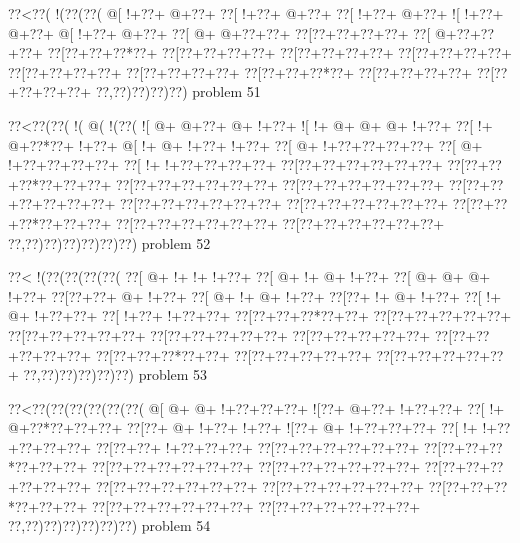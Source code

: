 \vbox{\vbox{\goo
\0??<\0??(\- !(\0??(\0??(
\- @[\- !+\0??+\- @+\0??+
\0??[\- !+\0??+\- @+\0??+
\0??[\- !+\0??+\- @+\0??+
\- ![\- !+\0??+\- @+\0??+
\- @[\- !+\0??+\- @+\0??+
\0??[\- @+\- @+\0??+\0??+
\0??[\0??+\0??+\0??+\0??+
\0??[\- @+\0??+\0??+\0??+
\0??[\0??+\0??+\0??*\0??+
\0??[\0??+\0??+\0??+\0??+
\0??[\0??+\0??+\0??+\0??+
\0??[\0??+\0??+\0??+\0??+
\0??[\0??+\0??+\0??+\0??+
\0??[\0??+\0??+\0??+\0??+
\0??[\0??+\0??+\0??*\0??+
\0??[\0??+\0??+\0??+\0??+
\0??[\0??+\0??+\0??+\0??+
\0??,\0??)\0??)\0??)\0??)
}
\hfil problem 51\hfil\break
}

\vbox{\vbox{\goo
\0??<\0??(\0??(\- !(\- @(\- !(\0??(
\- ![\- @+\- @+\0??+\- @+\- !+\0??+
\- ![\- !+\- @+\- @+\- @+\- !+\0??+
\0??[\- !+\- @+\0??*\0??+\- !+\0??+
\- @[\- !+\- @+\- !+\0??+\- !+\0??+
\0??[\- @+\- !+\0??+\0??+\0??+\0??+
\0??[\- @+\- !+\0??+\0??+\0??+\0??+
\0??[\- !+\- !+\0??+\0??+\0??+\0??+
\0??[\0??+\0??+\0??+\0??+\0??+\0??+
\0??[\0??+\0??+\0??*\0??+\0??+\0??+
\0??[\0??+\0??+\0??+\0??+\0??+\0??+
\0??[\0??+\0??+\0??+\0??+\0??+\0??+
\0??[\0??+\0??+\0??+\0??+\0??+\0??+
\0??[\0??+\0??+\0??+\0??+\0??+\0??+
\0??[\0??+\0??+\0??+\0??+\0??+\0??+
\0??[\0??+\0??+\0??*\0??+\0??+\0??+
\0??[\0??+\0??+\0??+\0??+\0??+\0??+
\0??[\0??+\0??+\0??+\0??+\0??+\0??+
\0??,\0??)\0??)\0??)\0??)\0??)\0??)
}
\hfil problem 52\hfil\break
}

\vbox{\vbox{\goo
\0??<\- !(\0??(\0??(\0??(\0??(
\0??[\- @+\- !+\- !+\- !+\0??+
\0??[\- @+\- !+\- @+\- !+\0??+
\0??[\- @+\- @+\- @+\- !+\0??+
\0??[\0??+\0??+\- @+\- !+\0??+
\0??[\- @+\- !+\- @+\- !+\0??+
\0??[\0??+\- !+\- @+\- !+\0??+
\0??[\- !+\- @+\- !+\0??+\0??+
\0??[\- !+\0??+\- !+\0??+\0??+
\0??[\0??+\0??+\0??*\0??+\0??+
\0??[\0??+\0??+\0??+\0??+\0??+
\0??[\0??+\0??+\0??+\0??+\0??+
\0??[\0??+\0??+\0??+\0??+\0??+
\0??[\0??+\0??+\0??+\0??+\0??+
\0??[\0??+\0??+\0??+\0??+\0??+
\0??[\0??+\0??+\0??*\0??+\0??+
\0??[\0??+\0??+\0??+\0??+\0??+
\0??[\0??+\0??+\0??+\0??+\0??+
\0??,\0??)\0??)\0??)\0??)\0??)
}
\hfil problem 53\hfil\break
}

\vbox{\vbox{\goo
\0??<\0??(\0??(\0??(\0??(\0??(\0??(
\- @[\- @+\- @+\- !+\0??+\0??+\0??+
\- ![\0??+\- @+\0??+\- !+\0??+\0??+
\0??[\- !+\- @+\0??*\0??+\0??+\0??+
\0??[\0??+\- @+\- !+\0??+\- !+\0??+
\- ![\0??+\- @+\- !+\0??+\0??+\0??+
\0??[\- !+\- !+\0??+\0??+\0??+\0??+
\0??[\0??+\0??+\- !+\0??+\0??+\0??+
\0??[\0??+\0??+\0??+\0??+\0??+\0??+
\0??[\0??+\0??+\0??*\0??+\0??+\0??+
\0??[\0??+\0??+\0??+\0??+\0??+\0??+
\0??[\0??+\0??+\0??+\0??+\0??+\0??+
\0??[\0??+\0??+\0??+\0??+\0??+\0??+
\0??[\0??+\0??+\0??+\0??+\0??+\0??+
\0??[\0??+\0??+\0??+\0??+\0??+\0??+
\0??[\0??+\0??+\0??*\0??+\0??+\0??+
\0??[\0??+\0??+\0??+\0??+\0??+\0??+
\0??[\0??+\0??+\0??+\0??+\0??+\0??+
\0??,\0??)\0??)\0??)\0??)\0??)\0??)
}
\hfil problem 54\hfil\break
}

